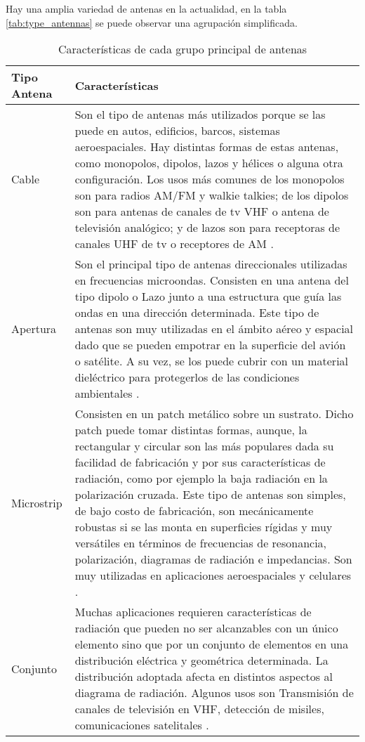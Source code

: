 Hay una amplia variedad de antenas en la actualidad, en la tabla \ref{tab:type_antennas} se puede observar una agrupación 
simplificada.

\begin{table}[H]
  \caption{Características de cada grupo principal de antenas}
  \footnotesize
  \centering
  \begin{tabular}{l p{12.5cm}}
  \toprule
  \textbf{Tipo Antena} & \textbf{Características} \tabularnewline
  \midrule
  Cable & Son el tipo de antenas más utilizados porque se las puede en autos, edificios, barcos, sistemas aeroespaciales. Hay distintas formas de estas antenas, como monopolos, dipolos, lazos y hélices o alguna otra configuración. Los usos más comunes de los monopolos son para radios AM/FM y walkie talkies; de los dipolos son para antenas de canales de tv VHF o antena de televisión analógico; y de lazos son para receptoras de canales UHF de tv o receptores de AM \cite{Balanis2012}. \tabularnewline

  Apertura & Son el principal tipo de antenas direccionales utilizadas en frecuencias microondas. Consisten en una antena
  del tipo dipolo o Lazo junto a una estructura que guía las ondas en una dirección determinada. Este tipo de antenas son muy utilizadas en el ámbito aéreo y espacial dado que se pueden empotrar en la superficie del avión o satélite. A su vez, se los puede cubrir con un material dieléctrico para protegerlos de las condiciones ambientales \cite{Balanis2012}. \tabularnewline
  
  Microstrip & Consisten en un patch metálico sobre un sustrato. Dicho patch puede tomar distintas formas, aunque, la rectangular y circular son las más populares dada su facilidad de fabricación y por sus características de radiación, como por ejemplo la baja radiación en la polarización cruzada. Este tipo de antenas son simples, de bajo costo de fabricación, son mecánicamente robustas si se las monta en superficies rígidas y muy versátiles en términos de frecuencias de resonancia, polarización, diagramas de radiación e impedancias. Son muy utilizadas en aplicaciones aeroespaciales y celulares \cite{Balanis2012}. \tabularnewline

  Conjunto & Muchas aplicaciones requieren características de radiación que pueden no ser alcanzables con un único elemento sino que por un conjunto de elementos en una distribución eléctrica y geométrica determinada. La distribución adoptada afecta en distintos aspectos al diagrama de radiación. Algunos usos son Transmisión de canales de televisión en VHF, detección de misiles, comunicaciones satelitales \cite{Balanis2012}. \tabularnewline
  

\end{tabular}
\end{table}
